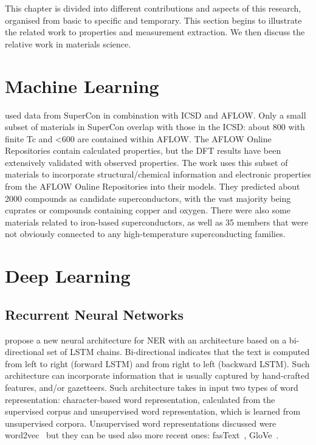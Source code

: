 
This chapter is divided into different contributions and aspects of this research, organised from basic to specific and temporary. 
This section begins to illustrate the related work to properties and measurement extraction. We then discuss the relative work in materials science. 

\section{Machine Learning}

\cite{stanev_machine_2017} used data from SuperCon in combination with ICSD and AFLOW. 
Only a small subset of materials in SuperCon overlap with those in the ICSD: about 800 with finite Tc and <600 are contained within AFLOW. 
The AFLOW Online Repositories contain calculated properties, but the DFT results have been extensively validated with observed properties. 
The work uses this subset of materials to incorporate structural/chemical information and electronic properties from the AFLOW Online Repositories into their models. 
They predicted about 2000 compounds as candidate superconductors, with the vast majority being cuprates or compounds containing copper and oxygen. 
There were also some materials related to iron-based superconductors, as well as 35 members that were not obviously connected to any high-temperature superconducting families.


\section{Deep Learning}

\subsection{Recurrent Neural Networks}
\cite{lample2016neural} propose a new neural architecture for NER with an architecture based on a bi-directional set of LSTM chains. 
Bi-directional indicates that the text is computed from left to right (forward LSTM) and from right to left (backward LSTM). 
Such architecture can incorporate information that is usually captured by hand-crafted features, and/or gazetteers. 
Such architecture takes in input two types of word representation: character-based word representation, calculated from the supervised corpus and unsupervised word representation, which is learned from unsupervised corpora. 
Unsupervised word representations discussed were word2vec~\cite{mikolov2013efficient} but they can be used also more recent ones: fasText~\cite{joulin2016fasttext}, GloVe~\cite{pennington2014glove}.

